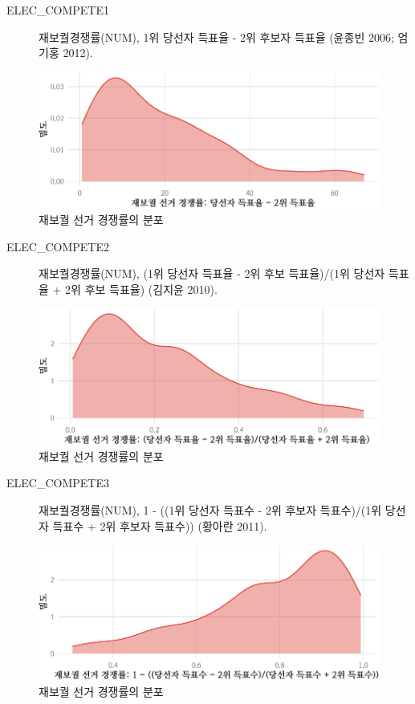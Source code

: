 \documentclass[
  11pt,
  letter]{article}
\begin{document}
\begin{description}
\item[ELEC\_COMPETE1]
재보궐경쟁률(NUM), 1위 당선자 득표율 - 2위 후보자 득표율 (윤종빈 2006;
엄기홍 2012).
\end{description}

\begin{figure}
\centering
\includegraphics{Codebook_national_files/figure-latex/unnamed-chunk-7-1.pdf}
\caption{재보궐 선거 경쟁률의 분포}
\end{figure}

\begin{description}
\item[ELEC\_COMPETE2]
재보궐경쟁률(NUM), (1위 당선자 득표율 - 2위 후보 득표율)/(1위 당선자
득표율 + 2위 후보 득표율) (김지윤 2010).
\end{description}

\begin{figure}
\centering
\includegraphics{Codebook_national_files/figure-latex/unnamed-chunk-8-1.pdf}
\caption{재보궐 선거 경쟁률의 분포}
\end{figure}

\begin{description}
\item[ELEC\_COMPETE3]
재보궐경쟁률(NUM), 1 - ((1위 당선자 득표수 - 2위 후보자 득표수)/(1위
당선자 득표수 + 2위 후보자 득표수)) (황아란 2011).
\end{description}

\begin{figure}
\centering
\includegraphics{Codebook_national_files/figure-latex/unnamed-chunk-9-1.pdf}
\caption{재보궐 선거 경쟁률의 분포}
\end{figure}
\end{document}
